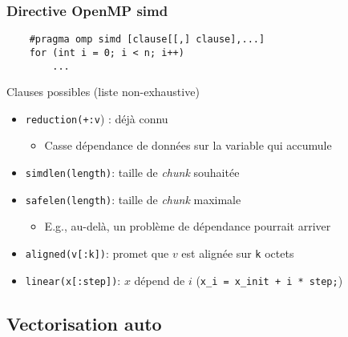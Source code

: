 \documentclass[xcolor={x11names,svgnames}]{beamer}
\begin{document}

\begin{frame}[fragile=singleslide]
  \frametitle{Directive OpenMP simd}
  
  \begin{verbatim}
    #pragma omp simd [clause[[,] clause],...]
    for (int i = 0; i < n; i++)
        ...
   \end{verbatim}

   \begin{block}{Clauses possibles (liste non-exhaustive)}
     \begin{itemize}
     \item \texttt{reduction(+:v}) : déjà connu
       \begin{itemize}
       \item Casse dépendance de données sur la variable qui accumule
       \end{itemize}
       \smallskip
       
     \item \texttt{simdlen(length)}: taille de \textit{chunk} souhaitée
\smallskip
       
     \item \texttt{safelen(length)}: taille de \textit{chunk} maximale
       \begin{itemize}
       \item E.g., au-delà, un problème de dépendance pourrait arriver
       \end{itemize}
\smallskip
       
     \item \texttt{aligned(v[:k])}: promet que $v$ est alignée sur \texttt{k} octets
\smallskip


     \item \texttt{linear(x[:step])}: $x$ dépend de $i$ (\texttt{x_i = x_init + i * step;})
     \end{itemize}
   \end{block}
 \end{frame}


\subsection{Vectorisation auto}

\end{document}
